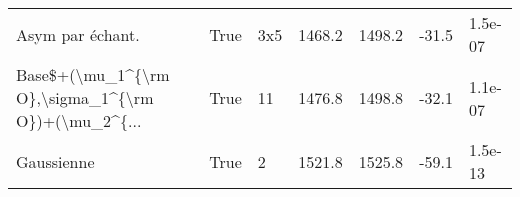 \begin{tabular}{lllrrrl}
                                  Asym par échant. &  True &        3x5 &         1468.2 & 1498.2 &         -31.5 & 1.5e-07 \\
Base\$+(\textbackslash mu\_1\textasciicircum \{\textbackslash rm O\},\textbackslash sigma\_1\textasciicircum \{\textbackslash rm O\})+(\textbackslash mu\_2\textasciicircum \{... &  True &         11 &         1476.8 & 1498.8 &         -32.1 & 1.1e-07 \\
                                        Gaussienne &  True &          2 &         1521.8 & 1525.8 &         -59.1 & 1.5e-13 \\
\bottomrule
\end{tabular}
